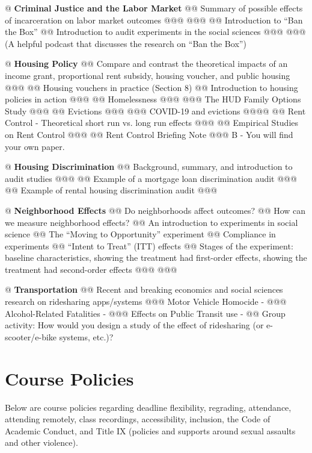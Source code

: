 \documentclass[11pt,letterpaper,final]{article}
\begin{document}
{@ \textbf{Criminal Justice and the Labor Market}
@@ Summary of possible effects of incarceration on labor market outcomes
@@@ \citet{Bhuller2020}
@@@ \citet{Eren2021}
@@ Introduction to ``Ban the Box''
@@ Introduction to audit experiments in the social sciences
@@@ \citet{Agan2018}
@@@ \citet{Doleac2019} (A helpful podcast that discusses the research on ``Ban the Box'')

@ \textbf{Housing Policy}
@@ Compare and contrast the theoretical impacts of an income grant, proportional rent subsidy, housing voucher, and public housing
@@@ 
@@ Housing vouchers in practice (Section 8)
@@ Introduction to housing policies in action
@@@ \citet{Metcalf2018}
@@ Homelessness
@@@ \citet{Evans2016}
@@@ The HUD Family Options Study
@@@ \citet{Gubits2017}
@@ Evictions
@@@ \citet{Humphries2019}
@@@ COVID-19 and evictions
@@@@ \citet{Callison2021}
@@ Rent Control - Theoretical short run vs. long run effects
@@@ 
@@ Empirical Studies on Rent Control
@@@ \citet{Jenkins2009}
@@ Rent Control Briefing Note
@@@ B - You will find your own paper.

@ \textbf{Housing Discrimination}
@@ Background, summary, and introduction to audit studies
@@@ \citet{Yinger1998}
@@ Example of a mortgage loan discrimination audit
@@@ \citet{Balfe2019}
@@ Example of rental housing discrimination audit
@@@ \citet{Phillips2016}

@ \textbf{Neighborhood Effects}
@@ Do neighborhoods affect outcomes?
@@ How can we measure neighborhood effects?
@@ An introduction to experiments in social science
@@ The ``Moving to Opportunity'' experiment
@@ Compliance in experiments
@@ ``Intent to Treat'' (ITT) effects
@@ Stages of the experiment: baseline characteristics, showing the treatment had first-order effects, showing the treatment had second-order effects
@@@ \citet{Ludwig2012}
@@@ \citet{Bergman2019}

@ \textbf{Transportation}
@@ Recent and breaking economics and social sciences research on ridesharing apps/systems
@@@ Motor Vehicle Homocide - \citet{Greenwood2017}
@@@ Alcohol-Related Fatalities - \citet{Anderson2021}
@@@ Effects on Public Transit use - \citet{Hall2018}
@@ Group activity: How would you design a study of the effect of ridesharing (or e-scooter/e-bike systems, etc.)? 
}

\section{Course Policies}
Below are course policies regarding deadline flexibility, regrading, attendance, attending remotely, class recordings, accessibility, inclusion, the Code of Academic Conduct, and Title IX (policies and supports around sexual assaults and other violence).
 
\end{document}
